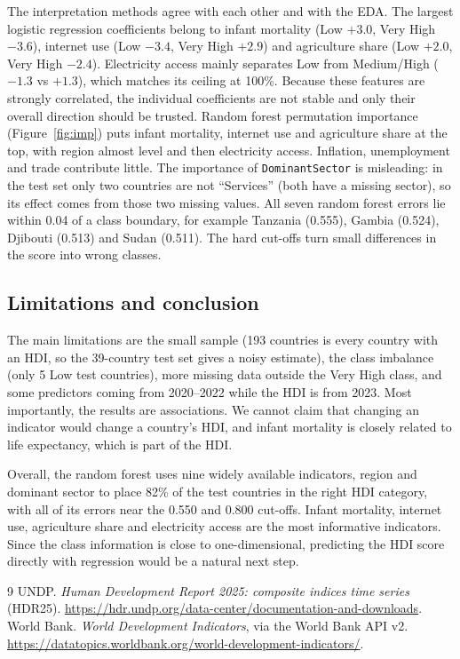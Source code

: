 \documentclass[10pt]{article}
\begin{document}
The interpretation methods agree with each other and with the EDA. The largest logistic regression coefficients
belong to infant mortality (Low $+3.0$, Very High $-3.6$), internet use (Low $-3.4$, Very High $+2.9$) and
agriculture share (Low $+2.0$, Very High $-2.4$). Electricity access mainly separates Low from Medium/High
($-1.3$ vs $+1.3$), which matches its ceiling at 100\%. Because these features are strongly correlated, the
individual coefficients are not stable and only their overall direction should be trusted. Random forest
permutation importance (Figure~\ref{fig:imp}) puts infant mortality, internet use and agriculture share at the
top, with region almost level and then electricity access. Inflation, unemployment and trade contribute little. The importance of \texttt{DominantSector} is misleading: in the
test set only two countries are not ``Services'' (both have a missing sector), so its effect comes from those two
missing values. All seven random forest errors lie within 0.04 of a class boundary, for example Tanzania (0.555),
Gambia (0.524), Djibouti (0.513) and Sudan (0.511). The hard cut-offs turn small differences in the
score into wrong classes.

\subsection{Limitations and conclusion}

The main limitations are the small sample (193 countries is every country with an HDI, so the 39-country test set
gives a noisy estimate), the class imbalance (only 5 Low test countries), more missing data outside the Very High
class, and some predictors coming from 2020--2022 while the HDI is from 2023. Most importantly, the results
are associations. We cannot claim that changing an indicator would change a country's HDI, and infant
mortality is closely related to life expectancy, which is part of the HDI.

Overall, the random forest uses nine widely available indicators, region and dominant sector to place 82\% of the
test countries in the right HDI category, with all of its errors near the 0.550 and 0.800 cut-offs. Infant mortality,
internet use, agriculture share and electricity access are the most informative indicators. Since the class information is close to one-dimensional, predicting the HDI score
directly with regression would be a natural next step.

\begin{thebibliography}{9}\small
\setlength{\itemsep}{0pt}
 UNDP. \textit{Human Development Report 2025: composite indices time series} (HDR25).
\url{https://hdr.undp.org/data-center/documentation-and-downloads}. 
 World Bank. \textit{World Development Indicators}, via the World Bank API v2.
\url{https://datatopics.worldbank.org/world-development-indicators/}. 
\end{thebibliography}
\end{document}
